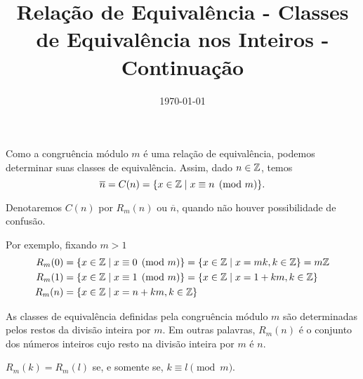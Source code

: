\documentclass{beamer}
\title{Rela\c{c}\~ao de Equival\^encia - Classes de Equivalência nos Inteiros - Continuação}
\author[\autor]{\autor}
\institute[\instituto]{\instituto}
\date{\today}
\begin{document}
    \begin{frame}
        \maketitle
    \end{frame}


    \begin{frame}
        Como a congru{\^e}ncia m{\'o}dulo $m$ {\'e} uma rela{\c c}{\~a}o de equival{\^e}ncia, podemos determinar suas classes de equival{\^e}ncia. Assim, dado $n \in \mathbb{Z}$, temos
        \[
            \overline{n} = C(n) = \{x \in \mathbb{Z} \mid x\equiv n \pmod{m}\}.
        \]

        Denotaremos $C(n)$ por $R_{m}(n)$ ou $\overline{n}$, quando n{\~a}o houver possibilidade de confus{\~a}o.

        Por exemplo, fixando $m > 1$
        \begin{align*}
            R_{m}(0) &= \{x \in \mathbb{Z} \mid x\equiv 0 \pmod{m}\}=\{x\in \mathbb{Z} \mid x = mk, k\in\mathbb{Z}\}=m\mathbb{Z}\\
            R_{m}(1) &= \{x\in\mathbb{Z} \mid x\equiv 1 \pmod{m}\}=\{x\in\mathbb{Z} \mid x = 1 + km, k\in\mathbb{Z}\}\\
            R_{m}(n) &= \{x\in\mathbb{Z} \mid x = n + km, k\in\mathbb{Z}\}
        \end{align*}
    \end{frame}
    \begin{frame}
        \begin{proposicao}
            As classes de equival{\^e}ncia definidas pela congru{\^e}ncia m{\'o}dulo $m$ s{\~a}o determinadas pelos restos da divis{\~a}o inteira por $m$. Em outras palavras, $R_{m}(n)$ {\'e} o conjunto dos n{\'u}meros inteiros cujo resto na divis{\~a}o inteira por $m$ {\'e} $n$.
        \end{proposicao}

        \begin{corolario}
            $R_{m}(k) = R_{m}(l)$ se, e somente se, $k\equiv l \pmod{m}$.
        \end{corolario}
    \end{frame}
\end{document}
